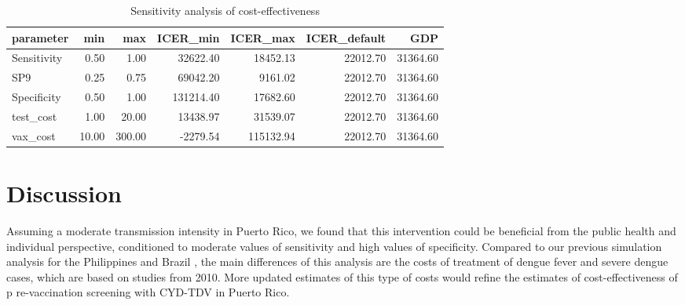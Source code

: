 \documentclass[11pt]{article}
\begin{document}
\begin{table}[ht]
\centering
\begin{tabular}{lrrrrrr}
  \hline
parameter & min & max & ICER\_min & ICER\_max & ICER\_default & GDP \\ 
  \hline
Sensitivity & 0.50 & 1.00 & 32622.40 & 18452.13 & 22012.70 & 31364.60 \\ 
  SP9 & 0.25 & 0.75 & 69042.20 & 9161.02 & 22012.70 & 31364.60 \\ 
  Specificity & 0.50 & 1.00 & 131214.40 & 17682.60 & 22012.70 & 31364.60 \\ 
  test\_cost & 1.00 & 20.00 & 13438.97 & 31539.07 & 22012.70 & 31364.60 \\ 
  vax\_cost & 10.00 & 300.00 & -2279.54 & 115132.94 & 22012.70 & 31364.60 \\ 
   \hline
\end{tabular}
\caption{Sensitivity analysis of cost-effectiveness} 
\label{table-tornado}
\end{table}

\section{Discussion}
\label{sec:org6a13bc5}
Assuming a moderate transmission intensity in Puerto Rico, we found that this intervention could be beneficial from the public health and individual perspective, conditioned to moderate values of sensitivity and high values of specificity. Compared to our previous simulation analysis for the Philippines and Brazil \cite{Espana2019Biorxiv}, the main differences of this analysis are the costs of treatment of dengue fever and severe dengue cases, which are based on studies from 2010. More updated estimates of this type of costs would refine the estimates of cost-effectiveness of p re-vaccination screening with CYD-TDV in Puerto Rico. 


 
\end{document}
